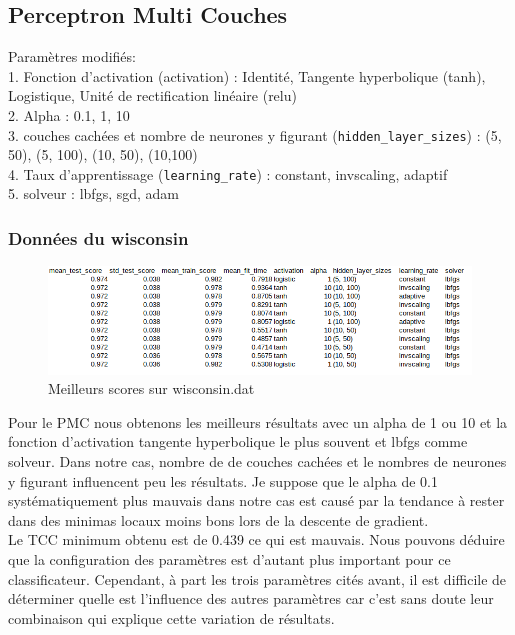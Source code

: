 \documentclass[10pt,letterpaper]{article}
\begin{document}
\newpage


\subsection*{Perceptron Multi Couches}
Paramètres modifiés:\\
    1. Fonction d’activation (activation) : Identité, Tangente hyperbolique (tanh), Logistique, Unité de rectification linéaire (relu)\\
    2. Alpha : 0.1, 1, 10\\
    3. couches cachées et nombre de neurones y figurant (\verb!hidden_layer_sizes!) : (5, 50), (5, 100), (10, 50), (10,100)\\
    4. Taux d’apprentissage (\verb!learning_rate!) : constant, invscaling, adaptif\\
    5.  solveur : lbfgs, sgd, adam\\
\vspace{2mm}
\subsubsection*{Données du wisconsin}
\begin{figure}[h]
	\includegraphics[scale=0.65]{images/wisc_pmc_1.png}
	\caption{Meilleurs scores sur wisconsin.dat}
\end{figure}

Pour le PMC nous obtenons les meilleurs résultats avec un alpha de 1 ou 10 et la fonction d’activation tangente hyperbolique le plus souvent et lbfgs comme solveur.
Dans notre cas, nombre de de couches cachées et le nombres de neurones y figurant influencent peu les résultats.
Je suppose que le alpha de 0.1 systématiquement plus mauvais dans notre cas est causé par la tendance à rester dans des minimas locaux moins bons lors de la descente de gradient.\\
\vspace{2mm}
Le TCC minimum obtenu est de 0.439 ce qui est mauvais. Nous pouvons déduire que la configuration des paramètres est d’autant plus important pour ce classificateur. Cependant, à part les trois paramètres cités avant, il est difficile de déterminer quelle est l’influence des autres paramètres car c’est sans doute leur combinaison qui explique cette variation de résultats.
\end{document}
